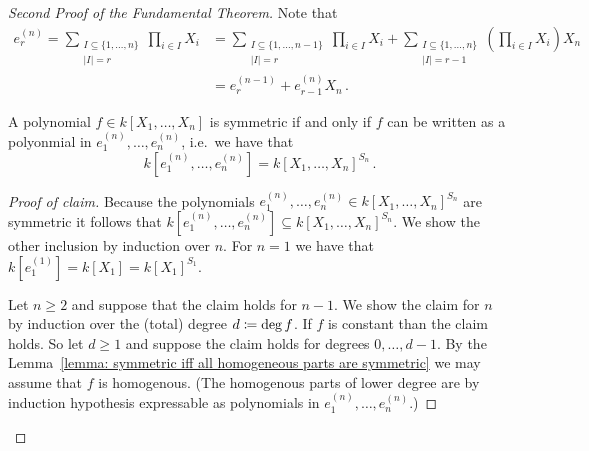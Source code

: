\begin{proof}[Second Proof of the Fundamental Theorem]
  Note that
  \begin{equation}
    \label{equation: recursive formel for elementary symmetric polynomials}
    \tag{$\ast$}
    \begin{aligned}
          e^{(n)}_r
      =  \sum_{\substack{I \subseteq \{1, \dotsc, n\} \\ |I| = r}} \prod_{i \in I} X_i
      &=    \sum_{\substack{I \subseteq \{1, \dotsc, n-1\} \\ |I| = r}} \prod_{i \in I} X_i
          + \sum_{\substack{I \subseteq \{1, \dotsc, n\} \\ |I| = r-1}} \left( \prod_{i \in I} X_i \right) X_n  \\
      &=  e^{(n-1)}_r + e^{(n)}_{r-1} X_n \,.
    \end{aligned}
  \end{equation}
  \begin{claim}
    A polynomial $f \in k[X_1, \dotsc, X_n]$ is symmetric if and only if $f$ can be written as a polyonmial in $e^{(n)}_1, \dotsc, e^{(n)}_n$, i.e.\ we have that
    \[
        k\left[ e^{(n)}_1, \dotsc, e^{(n)}_n \right]
      = k[X_1, \dotsc, X_n]^{S_n} \,.
    \]
  \end{claim}
  \begin{proof}[Proof of claim]
    Because the polynomials $e^{(n)}_1, \dotsc, e^{(n)}_n \in k[X_1, \dotsc, X_n]^{S_n}$ are symmetric it follows that $k[ e^{(n)}_1, \dotsc, e^{(n)}_n ] \subseteq k[X_1, \dotsc, X_n]^{S_n}$.
    We show the other inclusion by induction over $n$.
    For $n = 1$ we have that $k[ e^{(1)}_1 ] = k[X_1] = k[X_1]^{S_1}$.
    
    Let $n \geq 2$ and suppose that the claim holds for $n-1$.
    We show the claim for $n$ by induction over the (total) degree $d \coloneqq \deg f$.
    If $f$ is constant than the claim holds.
    So let $d \geq 1$ and suppose the claim holds for degrees $0, \dotsc, d-1$.
    By the Lemma~\ref{lemma: symmetric iff all homogeneous parts are symmetric} we may assume that $f$ is homogenous.
    (The homogenous parts of lower degree are by induction hypothesis expressable as polynomials in $e^{(n)}_1, \dotsc, e^{(n)}_n$.)
    

\end{proof}
\end{proof}
